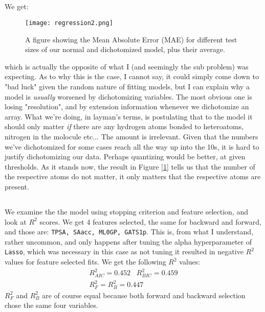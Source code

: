 \documentclass{article}
\begin{document}
\subsection{}
We get:
\begin{figure}[ht!]
    \centering
    \texttt{[image: regression2.png]}
    \caption{A figure showing the Mean Absolute Error (MAE) for different test sizes of our normal and dichotomized model, plus their average.}
    \label{figR2}
\end{figure} \newline
which is actually the opposite of what I (and seemingly the sub problem) was expecting. As to why this is the case, I cannot say, it could simply come down to "bad luck" given the random nature of fitting models, but I can explain why a model is \emph{usually} worsened by dichotomizing variables.
\newline
The most obvious one is losing "resolution", and by extension information whenever we dichotomize an array. What we're doing, in layman's terms, is postulating that to the model it should only matter \emph{if} there are any hydrogen atoms bonded to heteroatoms, nitrogen in the molocule etc... The amount is irrelevant. \newline
Given that the numbers we've dichotomized for some cases reach all the way up into the 10s, it is hard to justify dichotomizing our data. Perhaps quantizing would be better, at given thresholds. \newline
As it stands now, the result in Figure [\ref{figR2}] tells us that the number of the respective atoms do not matter, it only matters that the respective atoms are present.
\subsection{}
We examine the the model using stopping criterion and feature selection, and look at $R^2$ scores. We get 4 features selected, the same for backward and forward, and those are: \texttt{TPSA, SAacc, ML0GP, GATS1p}. This is, from what I understand, rather uncommon, and only happens after tuning the alpha hyperparameter of \texttt{Lasso}, which was necessary in this case as not tuning it resulted in negative $R^2$ values for feature selected fits.
\newline We get the following $R^2$ values:
\begin{equation*}
    \begin{gathered}
        R^2_{AIC} = 0.452 \;\;\; R^2_{BIC} = 0.459 \\ R^2_{F} = R^2_B = 0.447
    \end{gathered}
\end{equation*}
$R^2_F$ and $R^2_B$ are of course equal because both forward and backward selection chose the same four variables. 
\end{document}
